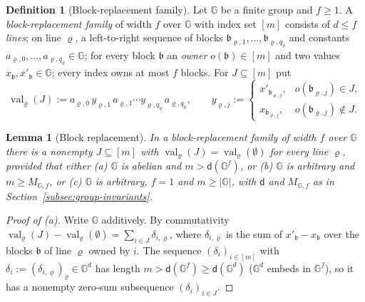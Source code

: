 \documentclass[11pt]{article}
\numberwithin{equation}{section}
\theoremstyle{plain}
\newtheorem{lemma}[theorem]{Lemma}
\theoremstyle{definition}
\newtheorem{definition}[theorem]{Definition}
\theoremstyle{remark}
\theoremstyle{plain}
\begin{document}
\begin{definition}[Block-replacement family]
\label{def:block-family}
Let ${\mathbb G}$ be a finite group and $f\ge1$.  A \emph{block-replacement family} of
width $f$ over ${\mathbb G}$ with index set $[m]$ consists of $d\le f$ \emph{lines}; on
line $\varrho$, a left-to-right sequence of blocks $\mathfrak b_{\varrho,1},\ldots,\mathfrak b_{\varrho,q_\varrho}$
and constants $a_{\varrho,0},\ldots,a_{\varrho,q_\varrho}\in {\mathbb G}$; for every block $\mathfrak b$ an
\emph{owner} $o(\mathfrak b)\in[m]$ and two values $x_{\mathfrak b},x'_{\mathfrak b}\in {\mathbb G}$; every
index owns at most $f$ blocks.  For $J\subseteq[m]$ put
\[
 \operatorname{val}_\varrho(J):=a_{\varrho,0}\,y_{\varrho,1}\,a_{\varrho,1}\cdots y_{\varrho,q_\varrho}\,a_{\varrho,q_\varrho},
 \qquad
 y_{\varrho,j}:=
 \begin{cases}
 x'_{\mathfrak b_{\varrho,j}},& o(\mathfrak b_{\varrho,j})\in J,\\
 x_{\mathfrak b_{\varrho,j}},& o(\mathfrak b_{\varrho,j})\notin J.
 \end{cases}
\]
\end{definition}

\begin{lemma}[Block replacement]
\label{lem:block-replacement}
In a block-replacement family of width $f$ over ${\mathbb G}$ there is a nonempty
$J\subseteq[m]$ with $\operatorname{val}_\varrho(J)=\operatorname{val}_\varrho(\emptyset)$ for every
line $\varrho$, provided that either
\textup{(a)} ${\mathbb G}$ is abelian and $m>\mathsf d({\mathbb G}^f)$, or
\textup{(b)} ${\mathbb G}$ is arbitrary and $m\ge M_{{\mathbb G},f}$, or
\textup{(c)} ${\mathbb G}$ is arbitrary, $f=1$ and $m\ge|{\mathbb G}|$, with $\mathsf d$ and
$M_{{\mathbb G},f}$ as in Section~\ref{subsec:group-invariants}.
\end{lemma}

\begin{proof}[Proof of \textup{(a)}]
Write ${\mathbb G}$ additively.  By commutativity
$\operatorname{val}_\varrho(J)-\operatorname{val}_\varrho(\emptyset)=\sum_{i\in J}\delta_{i,\varrho}$, where
$\delta_{i,\varrho}$ is the sum of $x'_{\mathfrak b}-x_{\mathfrak b}$ over the blocks $\mathfrak b$ of line $\varrho$
owned by $i$.  The sequence $(\delta_i)_{i\in[m]}$ with $\delta_i:=(\delta_{i,\varrho})_\varrho\in {\mathbb G}^d$
has length $m>\mathsf d({\mathbb G}^f)\ge\mathsf d({\mathbb G}^d)$ (${\mathbb G}^d$ embeds in ${\mathbb G}^f$), so it has a
nonempty zero-sum subsequence $(\delta_i)_{i\in J}$.
\end{proof}
\end{document}
